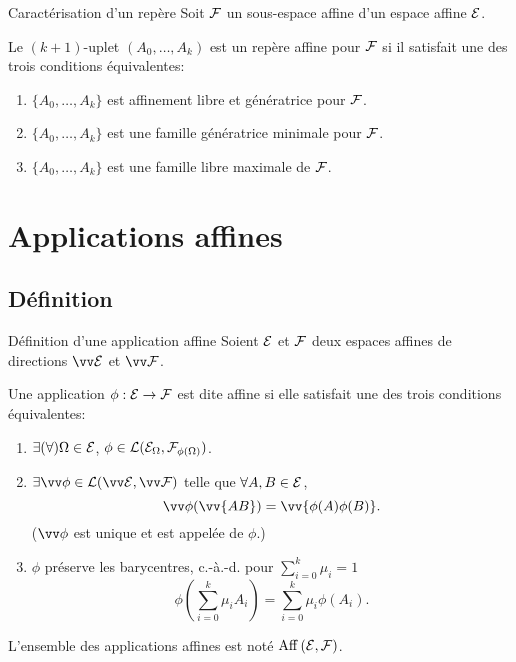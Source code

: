 \documentclass[bigger]{m53beamer}
\begin{document}
  \begin{frame}{Caractérisation d'un repère}
    Soit $\mathcal{F}$ un sous-espace affine d'un espace affine $\mathcal{E}$.
    \begin{proposition}
      Le $(k+1)$-uplet $(A_{0},\ldots,A_{k})$ est un repère affine pour $\mathcal{F}$ si il satisfait une des trois conditions équivalentes:
      \begin{enumerate}[<+(1)->]
        \item $\{A_{0},\ldots,A_{k}\}$ est affinement libre et génératrice pour $\mathcal{F}$.
        \item $\{A_{0},\ldots,A_{k}\}$ est une famille génératrice minimale pour $\mathcal{F}$.
        \item $\{A_{0},\ldots,A_{k}\}$ est une famille libre maximale de $\mathcal{F}$.
      \end{enumerate}
    \end{proposition}
  \end{frame}
\section{Applications affines}
\subsection{Définition}
  \begin{frame}{Définition d'une application affine}
    Soient $\mathcal{E}$ et $\mathcal{F}$ deux espaces affines de directions $\ev{E}$ et $\ev{F}$.
    \begin{defprop}
      Une application $\phi:\mathcal{E}\rightarrow\mathcal{F}$ est dite \alert{affine} si elle satisfait une des trois conditions équivalentes:
      \begin{enumerate}[<+(1)->]
        \item $\exists(\forall) \Omega \in \mathcal{E}$, $\phi\in\mathcal{L}(\mathcal{E}_{\Omega},\mathcal{F}_{\phi(\Omega)})$.
        \item $\exists \vv\phi \in \mathcal{L}(\ev{E},\ev{F})$ telle que $\forall A,B \in \mathcal{E}$,
          $$
            \vv\phi(\vv{AB})=\vv{\phi(A)\phi(B)}.
          $$
        ($\vv\phi$ est unique et est appelée  de $\phi$.)
        \item $\phi$ préserve les barycentres, c.-à.-d. pour $\sum_{i=0}^{k}\mu_{i}=1$
          $$
            \phi(\sum_{i=0}^{k}\mu_{i}A_{i})=\sum_{i=0}^{k}\mu_{i}\phi(A_{i}).
          $$
      \end{enumerate}\pause
      L'ensemble des applications affines est noté $\operatorname{Aff}\left(\mathcal{E},\mathcal{F}\right)$.
    \end{defprop}
  \end{frame}
\end{document}
